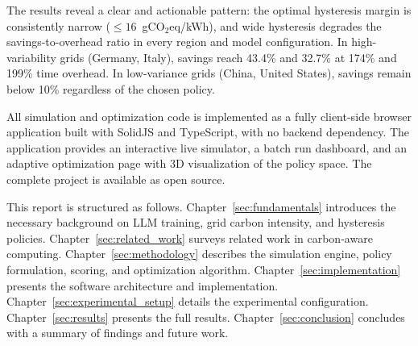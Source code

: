 The results reveal a clear and actionable pattern: the optimal hysteresis
margin is consistently narrow ($\leq 16$~gCO$_2$eq/kWh), and wide hysteresis
degrades the savings-to-overhead ratio in every region and model
configuration. In high-variability grids (Germany, Italy), savings reach
43.4\% and 32.7\% at 174\% and 199\% time overhead. In low-variance grids
(China, United States), savings remain below 10\% regardless of the chosen
policy.

All simulation and optimization code is implemented as a fully client-side
browser application built with SolidJS and TypeScript, with no backend
dependency. The application provides an interactive live simulator, a batch
run dashboard, and an adaptive optimization page with 3D visualization of the
policy space. The complete project is available as open source.

This report is structured as follows. Chapter~\ref{sec:fundamentals} introduces
the necessary background on LLM training, grid carbon intensity, and hysteresis
policies. Chapter~\ref{sec:related_work} surveys related work in carbon-aware
computing. Chapter~\ref{sec:methodology} describes the simulation engine,
policy formulation, scoring, and optimization algorithm.
Chapter~\ref{sec:implementation} presents the software architecture and
implementation. Chapter~\ref{sec:experimental_setup} details the experimental
configuration. Chapter~\ref{sec:results} presents the full results.
Chapter~\ref{sec:conclusion} concludes with a summary of findings
and future work.
